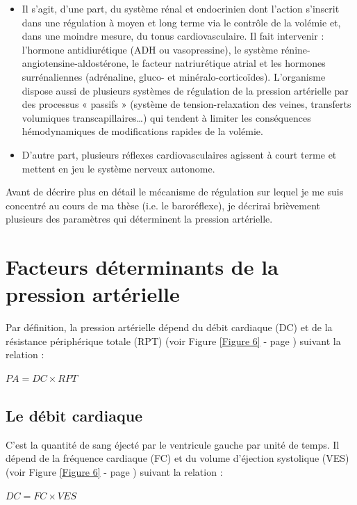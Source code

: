 \documentclass[a4paper,12pt,twoside]{report}
\begin{document}
\begin{itemize}
\item Il s’agit, d’une part, du système rénal et endocrinien dont l’action s’inscrit dans une régulation à moyen et long terme via le contrôle de la volémie et, dans une moindre mesure, du tonus cardiovasculaire. Il fait intervenir : l’hormone antidiurétique (ADH ou vasopressine), le système rénine-angiotensine-aldostérone, le facteur natriurétique atrial et les hormones surrénaliennes (adrénaline, gluco- et minéralo-corticoïdes). L’organisme dispose aussi de plusieurs systèmes de régulation de la pression artérielle par des processus « passifs » (système de tension-relaxation des veines, transferts volumiques transcapillaires\ldots) qui tendent à limiter les conséquences hémodynamiques de modifications rapides de la volémie. 
\item D’autre part, plusieurs réflexes cardiovasculaires agissent à court terme et mettent en jeu le système nerveux autonome. \end{itemize}

Avant de décrire plus en détail le mécanisme de régulation sur lequel je me suis concentré au cours de ma thèse (i.e. le baroréflexe), je décrirai brièvement plusieurs des paramètres qui déterminent la pression artérielle. 

\section{Facteurs déterminants de la pression artérielle}

Par définition, la pression artérielle dépend du débit cardiaque (DC) et de la résistance périphérique totale (RPT) (voir Figure \ref{Figure 6} - page \pageref{Figure 6}) suivant la relation :
\begin{center}
$PA = DC \times RPT$
\end{center}

\subsection{Le débit cardiaque }

C’est la quantité de sang éjecté par le ventricule gauche par unité de temps. Il dépend de la fréquence cardiaque (FC) et du volume d’éjection systolique (VES) (voir Figure \ref{Figure 6} - page \pageref{Figure 6}) suivant la relation :
\begin{center}
$DC = FC \times VES$
\end{center}
\end{document}
